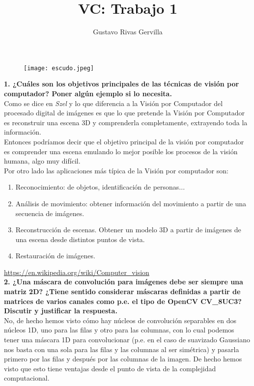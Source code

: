 \documentclass[10pt,a4paper]{article}
\author{Gustavo Rivas Gervilla}
\title{\textbf{VC: Trabajo 1}}
\date{}
\begin{document}
\maketitle

\begin{figure}[H]
\centering
\texttt{[image: escudo.jpeg]}
\end{figure}

\newpage


\textbf{1. ¿Cuáles son los objetivos principales de las técnicas de visión por computador? Poner algún ejemplo si lo necesita.}\\

Como se dice en \textit{Szel} y lo que diferencia a la Visión por Computador del procesado digital de imágenes es que lo que pretende la Visión por Computador es reconstruir una escena 3D y comprenderla completamente, extrayendo toda la información.\\

Entonces podríamos decir que el objetivo principal de la visión por computador es comprender una escena emulando lo mejor posible los procesos de la visión humana, algo muy difícil.\\

Por otro lado las aplicaciones más típica de la Visión por computador son:\\

\begin{enumerate}
\item Reconocimiento: de objetos, identificación de personas...
\item Análisis de movimiento: obtener información del movimiento a partir de una secuencia de imágenes.
\item Reconstrucción de escenas. Obtener un modelo 3D a partir de imágenes de una escena desde distintos puntos de vista.
\item Restauración de imágenes.
\end{enumerate}

\url{https://en.wikipedia.org/wiki/Computer_vision}\\


\textbf{2. ¿Una máscara de convolución para imágenes debe ser siempre una matriz 2D? ¿Tiene sentido considerar máscaras definidas a partir de matrices de varios canales como p.e. el tipo de OpenCV CV\_8UC3? Discutir y justificar la respuesta.}\\

No, de hecho hemos visto cómo hay núcleos de convolución separables en dos núcleos 1D, uno para las filas y otro para las columnas, con lo cual podemos tener una máscara 1D para convolucionar (p.e. en el caso de suavizado Gaussiano nos basta con una sola para las filas y las columnas al ser simétrica) y pasarla primero por las filas y después por las columnas de la imagen. De hecho hemos visto que esto tiene ventajas desde el punto de vista de la complejidad computacional.\\
\end{document}
